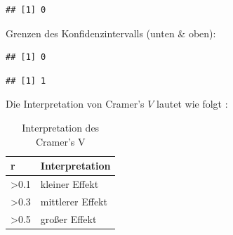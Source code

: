 \documentclass[
]{book}
\newenvironment{Shaded}{\begin{snugshade}}{\end{snugshade}}
\newcommand{\FunctionTok}[1]{\textcolor[rgb]{0.13,0.29,0.53}{\textbf{#1}}}
\newcommand{\NormalTok}[1]{#1}
\newcommand{\SpecialCharTok}[1]{\textcolor[rgb]{0.81,0.36,0.00}{\textbf{#1}}}
\begin{document}
\begin{verbatim}
## [1] 0
\end{verbatim}

Grenzen des Konfidenzintervalls (unten \& oben):

\begin{Shaded}
\end{Shaded}

\begin{verbatim}
## [1] 0
\end{verbatim}

\begin{Shaded}
\end{Shaded}

\begin{verbatim}
## [1] 1
\end{verbatim}

Die Interpretation von Cramer's \(V\) lautet wie folgt \citet{ellis2010essential}:

\begin{table}[tbp]

\begin{center}
\begin{threeparttable}

\caption{\label{tab:unnamed-chunk-298}Interpretation des Cramer's V}

\begin{tabular}{ll}
\toprule
r & \multicolumn{1}{c}{Interpretation}\\
\midrule
>0.1 & kleiner Effekt\\
>0.3 & mittlerer Effekt\\
>0.5 & großer Effekt\\
\bottomrule
\end{tabular}

\end{threeparttable}
\end{center}

\end{table}
\end{document}
